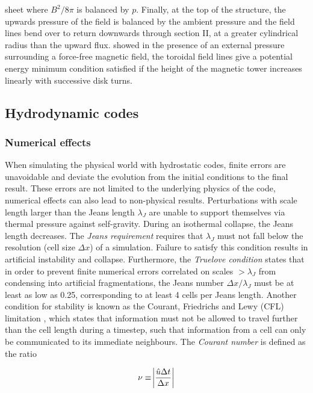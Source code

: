\documentclass[11pt]{article}
\begin{document}
sheet where $B^{2}/8\pi$  is balanced by $p$. Finally, at the top of the structure, the upwards pressure of the field is balanced by the ambient pressure and the field lines bend over to return downwards through section II, at a greater cylindrical radius than the upward flux. \cite{Lynden-Bell2003}  showed in the presence of an external pressure surrounding a force-free magnetic field, the toroidal field lines give a potential energy minimum condition satisfied if the height of the magnetic tower increases linearly with successive disk turns. 

\subsection{Hydrodynamic codes}
\subsubsection{Numerical effects}
\label{sub:numerical}
When simulating the physical world with hydrostatic codes, finite errors are unavoidable and deviate the evolution from the initial conditions to the final result. These errors are not limited to the underlying physics of the code, numerical effects can also lead to non-physical results. Perturbations with scale length larger than the Jeans length $\lambda_{J}$ are unable to support themselves via thermal pressure against self-gravity. During an isothermal collapse, the Jeans length decreases. The \emph{Jeans requirement} requires that $\lambda_{J}$ must not fall below the resolution (cell size $\Delta x$) of a simulation. Failure to satisfy this condition results in artificial instability and collapse. Furthermore, the \emph{Truelove condition} \citep{Truelove1997} states that in order to prevent finite numerical errors correlated on scales $>\lambda_{J}$ from condensing into artificial fragmentations, the Jeans number $\Delta x/\lambda_{J}$ must be at least as low as 0.25, corresponding to at least 4 cells per Jeans length. Another condition for stability is known as the Courant, Friedrichs and Lewy (CFL) limitation \citep{Courant1952}, which states that information must not be allowed to travel further than the cell length during a timestep, such that information from a cell can only be communicated to its immediate neighbours. The \emph{Courant number} is defined as the ratio \citep[p.~70]{LeVeque2002}

\begin{equation}
\nu \equiv \abs{\frac{\hat{u}\Delta t}{ \Delta x} }
\end{equation}
\end{document}
